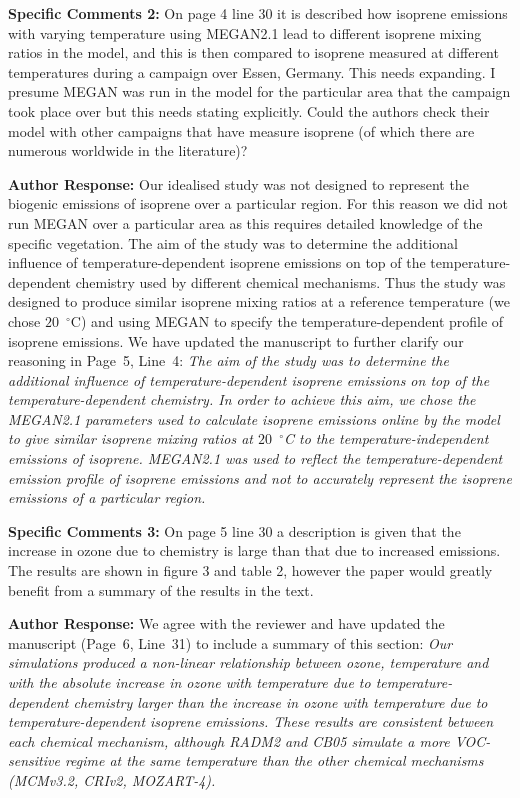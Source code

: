 \documentclass{article}
\DeclareRobustCommand*\degree{\ensuremath{^{\circ}}}
\begin{document}
\textbf{Specific Comments 2:} On page 4 line 30 it is described how isoprene emissions with varying temperature using MEGAN2.1 lead to different isoprene mixing ratios in the model, and this is then compared to isoprene measured at different temperatures during a campaign over Essen, Germany. This needs expanding. I presume MEGAN was run in the model for the particular area that the campaign took place over but this needs stating explicitly.  Could the authors check their model with other campaigns that have measure isoprene (of which there are numerous worldwide in the literature)?

\textbf{Author Response:} Our idealised study was not designed to represent the biogenic emissions of isoprene over a particular region. For this reason we did not run MEGAN over a particular area as this requires detailed knowledge of the specific vegetation. The aim of the study was to determine the additional influence of temperature-dependent isoprene emissions on top of the temperature-dependent chemistry used by different chemical mechanisms. Thus the study was designed to produce similar isoprene mixing ratios at a reference temperature (we chose $20$~\degree C) and using MEGAN to specify the temperature-dependent profile of isoprene emissions. We have updated the manuscript to further clarify our reasoning in Page~5, Line~4:
\textit{
The aim of the study was to determine the additional influence of temperature-dependent isoprene emissions on top of the temperature-dependent chemistry. In order to achieve this aim, we chose the MEGAN2.1 parameters used to calculate isoprene emissions online by the model to give similar isoprene mixing ratios at $20$~\degree C to the temperature-independent emissions of isoprene.
MEGAN2.1 was used to reflect the temperature-dependent emission profile of isoprene emissions and not to accurately represent the isoprene emissions of a particular region.
}

\textbf{Specific Comments 3:} On page 5 line 30 a description is given that the increase in ozone due to chemistry is large than that due to increased emissions. The results are shown in figure 3 and table 2, however the paper would greatly benefit from a summary of the results in the text. 

\textbf{Author Response:} We agree with the reviewer and have updated the manuscript (Page~6, Line~31) to include a summary of this section:
\textit{
Our simulations produced a non-linear relationship between ozone, temperature and  with the absolute increase in ozone with temperature due to temperature-dependent chemistry larger than the increase in ozone with temperature due to temperature-dependent isoprene emissions.
These results are consistent between each chemical mechanism, although RADM2 and CB05 simulate a more VOC-sensitive regime at the same temperature than the other chemical mechanisms (MCMv3.2, CRIv2, MOZART-4).
}
\end{document}

